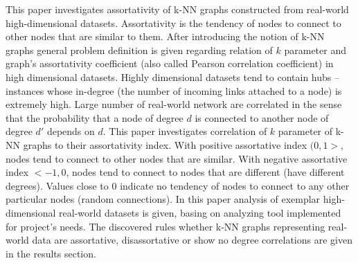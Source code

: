 This paper investigates assortativity of k-NN graphs constructed from real-world high-dimensional datasets.
Assortativity is the tendency of nodes to connect to other nodes that are similar to them.
After introducing the notion of k-NN graphs general problem definition is given regarding relation of $k$ parameter and graph's assortativity coefficient (also called Pearson correlation coefficient) in high dimensional datasets.
Highly dimensional datasets tend to contain hubs – instances whose in-degree (the number of incoming links attached to a node) is extremely high.
Large number of real-world network are correlated in the sense that the probability that a node of degree $d$ is connected to another node of degree $d'$ depends on $d$.
This paper investigates correlation of $k$ parameter of k-NN graphs to their assortativity index.
With positive assortative index $(0, 1>$, nodes tend to connect to other nodes that are similar.
With negative assortative index $<-1, 0$, nodes tend to connect to nodes that are different (have different degrees).
Values close to $0$ indicate no tendency of nodes to connect to any other particular nodes (random connections).
In this paper analysis of exemplar high-dimensional real-world datasets is given, basing on analyzing tool implemented for project's needs.
The discovered rules whether k-NN graphs representing real-world data are assortative, disassortative or show no degree correlations are given in the results section.